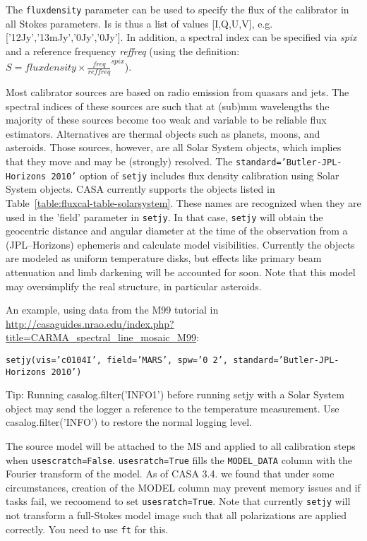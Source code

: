 The {\tt fluxdensity} parameter can be used to specify the flux of the
calibrator in all Stokes parameters. Is is thus a list of values
[I,Q,U,V], e.g. ['12Jy','13mJy','0Jy','0Jy']. In addition, a spectral
index can be specified via {\it spix} and a reference frequency {\it
  reffreq} (using the definition: $S = fluxdensity\times\frac{
  freq}{reffreq}^{spix}$).


Most calibrator sources are based on radio emission from quasars and
jets. The spectral indices of these sources are such that at (sub)mm
wavelengths the majority of these sources become too weak and variable
to be reliable flux estimators. Alternatives are thermal objects such
as planets, moons, and asteroids. Those sources, however, are all
Solar System objects, which implies that they move and may be
(strongly) resolved. The {\tt standard='Butler-JPL-Horizons 2010'}
option of {\tt setjy} includes flux density calibration using Solar
System objects. CASA currently supports the objects listed in
Table~\ref{table:fluxcal-table-solarsystem}. These names are
recognized when they are used in the 'field' parameter in {\tt setjy}.
In that case, {\tt setjy} will obtain the geocentric distance and
angular diameter at the time of the observation from a (JPL--Horizons)
ephemeris and calculate model visibilities.  Currently the objects are
modeled as uniform temperature disks, but effects like primary beam
attenuation and limb darkening will be accounted for soon. Note that
this model may oversimplify the real structure, in particular
asteroids.

An example, using data from the M99 tutorial in 
\url{http://casaguides.nrao.edu/index.php?title=CARMA_spectral_line_mosaic_M99}:

{\tt setjy(vis='c0104I', field='MARS', spw='0~2', standard='Butler-JPL-Horizons 2010')}

Tip: Running casalog.filter('INFO1') before running setjy with a Solar
System object may send the logger a reference to the temperature
measurement.  Use casalog.filter('INFO') to restore the normal logging
level.

The source model will be attached to the MS and applied to all
calibration steps when {\tt usescratch=False}. {\tt usesratch=True}
  fills the {\tt MODEL\_DATA} column with the Fourier transform of the
  model. As of CASA 3.4. we found that under some circumstances,
  creation of the MODEL column may prevent memory issues and if tasks
  fail, we recoomend to set {\tt usesratch=True}. Note that currently
  {\tt setjy} will not transform a full-Stokes model image such that
  all polarizations are applied correctly.  You need to use {\tt ft}
  for this.


